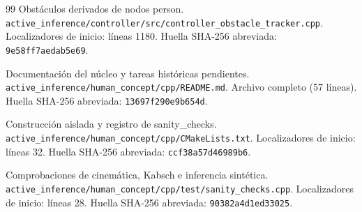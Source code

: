 \documentclass[11pt,a4paper]{article}
\newcommand{\code}[1]{\nolinkurl{#1}}
\newcommand{\file}[1]{\nolinkurl{#1}}
\begin{document}
\begin{thebibliography}{99}
 Obstáculos derivados de nodos person.
\file{active_inference/controller/src/controller_obstacle_tracker.cpp}.
Localizadores de inicio: líneas 1180. Huella SHA-256 abreviada: \code{9e58ff7aedab5e69}.

 Documentación del núcleo y tareas históricas pendientes.
\file{active_inference/human_concept/cpp/README.md}.
Archivo completo (57 líneas). Huella SHA-256 abreviada: \code{13697f290e9b654d}.

 Construcción aislada y registro de sanity\_checks.
\file{active_inference/human_concept/cpp/CMakeLists.txt}.
Localizadores de inicio: líneas 32. Huella SHA-256 abreviada: \code{ccf38a57d46989b6}.

 Comprobaciones de cinemática, Kabsch e inferencia sintética.
\file{active_inference/human_concept/cpp/test/sanity_checks.cpp}.
Localizadores de inicio: líneas 28. Huella SHA-256 abreviada: \code{90382a4d1ed33025}.

\end{thebibliography}
\end{document}
